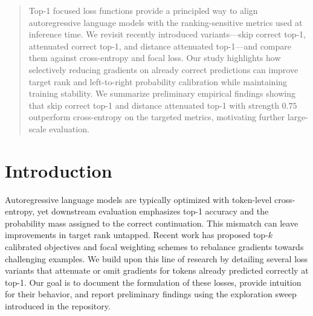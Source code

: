 \documentclass{article}
\begin{document}

\printAffiliationsAndNotice{\icmlEqualContribution}

\begin{abstract}
Top-1 focused loss functions provide a principled way to align autoregressive language models with the ranking-sensitive metrics used at inference time.
We revisit recently introduced variants---skip correct top-1, attenuated correct top-1, and distance attenuated top-1---and compare them against cross-entropy and focal loss.
Our study highlights how selectively reducing gradients on already correct predictions can improve target rank and left-to-right probability calibration while maintaining training stability.
We summarize preliminary empirical findings showing that skip correct top-1 and distance attenuated top-1 with strength $0.75$ outperform cross-entropy on the targeted metrics, motivating further large-scale evaluation.
\end{abstract}

\section{Introduction}
Autoregressive language models are typically optimized with token-level cross-entropy, yet downstream evaluation emphasizes top-1 accuracy and the probability mass assigned to the correct continuation.
This mismatch can leave improvements in target rank untapped.
Recent work has proposed top-$k$ calibrated objectives \citep{lapin2016topk} and focal weighting schemes \citep{lin2017focal} to rebalance gradients towards challenging examples.
We build upon this line of research by detailing several loss variants that attenuate or omit gradients for tokens already predicted correctly at top-1.
Our goal is to document the formulation of these losses, provide intuition for their behavior, and report preliminary findings using the exploration sweep introduced in the repository.
\end{document}
